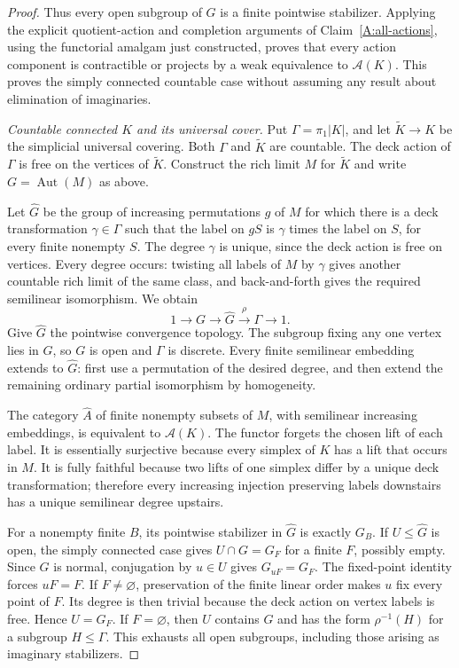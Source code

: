 \begin{proof}
Thus every open subgroup of $G$ is a finite pointwise stabilizer. Applying the explicit quotient-action and completion arguments of Claim~\ref{A:all-actions}, using the functorial amalgam just constructed, proves that every action component is contractible or projects by a weak equivalence to $\mathcal A(K)$. This proves the simply connected countable case without assuming any result about elimination of imaginaries.

\emph{Countable connected $K$ and its universal cover.}
Put $\Gamma=\pi_1|K|$, and let $\widetilde K\to K$ be the simplicial universal covering. Both $\Gamma$ and $\widetilde K$ are countable. The deck action of $\Gamma$ is free on the vertices of $\widetilde K$. Construct the rich limit $M$ for $\widetilde K$ and write $G=\operatorname{Aut}(M)$ as above.

Let $\widehat G$ be the group of increasing permutations $g$ of $M$ for which there is a deck transformation $\gamma\in\Gamma$ such that the label on $gS$ is $\gamma$ times the label on $S$, for every finite nonempty $S$. The degree $\gamma$ is unique, since the deck action is free on vertices. Every degree occurs: twisting all labels of $M$ by $\gamma$ gives another countable rich limit of the same class, and back-and-forth gives the required semilinear isomorphism. We obtain
\[
 1\longrightarrow G\longrightarrow\widehat G
   \xrightarrow{\rho}\Gamma\longrightarrow1.
\]
Give $\widehat G$ the pointwise convergence topology. The subgroup fixing any one vertex lies in $G$, so $G$ is open and $\Gamma$ is discrete. Every finite semilinear embedding extends to $\widehat G$: first use a permutation of the desired degree, and then extend the remaining ordinary partial isomorphism by homogeneity.

The category $\widehat A$ of finite nonempty subsets of $M$, with semilinear increasing embeddings, is equivalent to $\mathcal A(K)$. The functor forgets the chosen lift of each label. It is essentially surjective because every simplex of $K$ has a lift that occurs in $M$. It is fully faithful because two lifts of one simplex differ by a unique deck transformation; therefore every increasing injection preserving labels downstairs has a unique semilinear degree upstairs.

For a nonempty finite $B$, its pointwise stabilizer in $\widehat G$ is exactly $G_B$. If $U\leq\widehat G$ is open, the simply connected case gives $U\cap G=G_F$ for a finite $F$, possibly empty. Since $G$ is normal, conjugation by $u\in U$ gives $G_{uF}=G_F$. The fixed-point identity forces $uF=F$. If $F\ne\varnothing$, preservation of the finite linear order makes $u$ fix every point of $F$. Its degree is then trivial because the deck action on vertex labels is free. Hence $U=G_F$. If $F=\varnothing$, then $U$ contains $G$ and has the form $\rho^{-1}(H)$ for a subgroup $H\leq\Gamma$. This exhausts all open subgroups, including those arising as imaginary stabilizers.


\end{proof}
